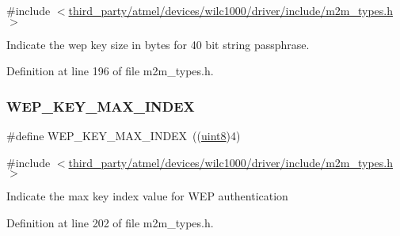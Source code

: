{\ttfamily \#include $<$\hyperlink{m2m__types_8h}{third\+\_\+party/atmel/devices/wilc1000/driver/include/m2m\+\_\+types.\+h}$>$}

Indicate the wep key size in bytes for 40 bit string passphrase. 

Definition at line 196 of file m2m\+\_\+types.\+h.

\mbox{\label{group__WlanDefines_gad8adc3240afeb11434b2c34d5c15ea00}} 
\subsubsection{\texorpdfstring{W\+E\+P\+\_\+\+K\+E\+Y\+\_\+\+M\+A\+X\+\_\+\+I\+N\+D\+EX}{WEP\_KEY\_MAX\_INDEX}}
{\footnotesize\ttfamily \#define W\+E\+P\+\_\+\+K\+E\+Y\+\_\+\+M\+A\+X\+\_\+\+I\+N\+D\+EX~((\hyperlink{group__DataT_ga4df709a77647e870bbf1d955b8edc9a6}{uint8})4)}



{\ttfamily \#include $<$\hyperlink{m2m__types_8h}{third\+\_\+party/atmel/devices/wilc1000/driver/include/m2m\+\_\+types.\+h}$>$}

Indicate the max key index value for W\+EP authentication 

Definition at line 202 of file m2m\+\_\+types.\+h.

